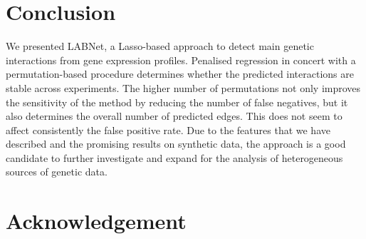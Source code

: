 \section{Conclusion} \label{conclusion}
We presented LABNet, a Lasso-based approach to detect main genetic interactions from gene expression profiles.  Penalised regression in concert with a permutation-based procedure determines whether the predicted interactions are stable across experiments. 
The higher number of permutations not only improves the sensitivity of the method by reducing the number of false negatives, but it also determines the overall number of predicted edges. This does not seem to affect consistently the false positive rate. Due to the features that we have described and the promising results on synthetic data, the approach is a good candidate to further investigate and expand for the analysis of heterogeneous sources of genetic data. 

\section*{Acknowledgement}
